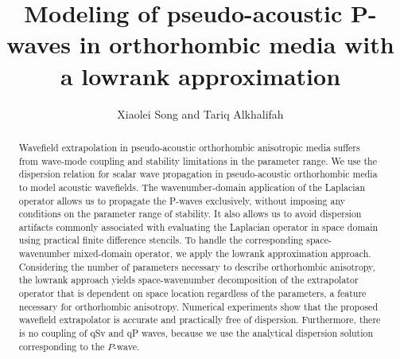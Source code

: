 
\title{Modeling of pseudo-acoustic P-waves in orthorhombic media with a lowrank approximation}

\renewcommand{\footnotemark}{\fnsymbol{footnote}} 

\author{Xiaolei Song and Tariq Alkhalifah}

\address{
\footnotemark[1]Bureau of Economic Geology \\
Jackson School of Geosciences \\
The University of Texas at Austin \\
University Station, Box X \\
Austin, TX 78713-8924 \\
USA\\
songxl@utexas.edu\\
\footnotemark[2]Physical Sciences and Engineering \\
King Abdullah University of Science and Technology \\
Mail box \# 1280 \\ 
Thuwal 23955-6900 \\
Saudi Arabia\\
tariq.alkhalifah@kaust.edu.sa
}

\maketitle

\begin{abstract}
Wavefield extrapolation in pseudo-acoustic orthorhombic anisotropic media suffers from 
wave-mode coupling and stability limitations in the parameter range.
We use the dispersion relation for scalar wave propagation in pseudo-acoustic orthorhombic media to model
acoustic wavefields. The wavenumber-domain application of the Laplacian operator allows us to propagate the P-waves exclusively,
without imposing any conditions on the parameter range of stability. It also allows us to avoid dispersion artifacts commonly associated
with evaluating the Laplacian operator in space domain using practical finite difference stencils.
To handle the corresponding space-wavenumber mixed-domain operator,
we apply the lowrank approximation approach. Considering the number of parameters necessary to describe orthorhombic anisotropy,
the lowrank approach yields space-wavenumber decomposition of the extrapolator operator that is dependent on space location regardless of the parameters,
a feature necessary for orthorhombic anisotropy.
Numerical experiments show that the proposed wavefield extrapolator is accurate and practically free of dispersion.
Furthermore, there is no coupling of qSv and qP waves,
because we use the analytical dispersion solution corresponding to the $P$-wave. 
\end{abstract}

